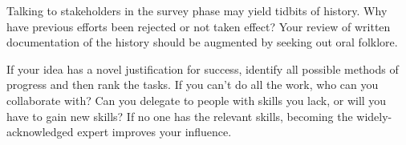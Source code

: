 Talking to stakeholders in the survey phase may yield tidbits of history. Why have previous efforts been rejected or not taken effect? Your review of written documentation of the history should be augmented by seeking out oral folklore. 

If your idea has a novel justification for success, identify all possible methods of progress and then rank the tasks. If you can't do all the work, who can you collaborate with? Can you delegate to people with skills you lack, or will you have to gain new skills? 
If no one has the relevant skills, becoming the widely-acknowledged expert improves your influence. 


